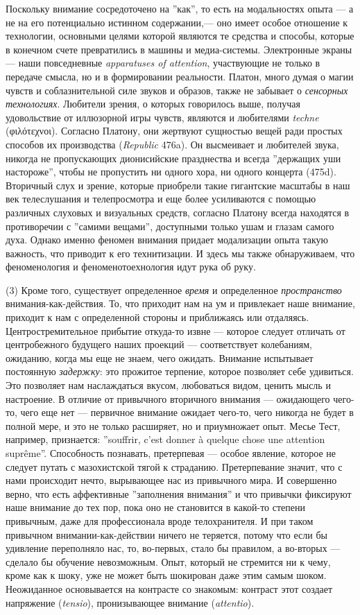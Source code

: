 \documentclass[12pt]{book}
\begin{document}
Поскольку внимание сосредоточено на ''как'', то есть на модальностях опыта --- а не на его потенциально истинном содержании,--- оно имеет особое отношение к технологии, основными целями которой являются те средства и способы, которые в конечном счете превратились в машины и медиа-системы. Электронные экраны --- наши повседневные \textit{apparatuses of attention}, участвующие не только в передаче смысла, но и в формировании реальности. Платон, много думая о магии чувств и соблазнительной силе звуков и образов, также не забывает о \textit{сенсорных технологиях}. Любители зрения, о которых говорилось выше, получая удовольствие от иллюзорной игры чувств, являются и любителями \textit{techne} (φιλότεχνοι). Согласно Платону, они жертвуют сущностью вещей ради простых способов их производства (\textit{Republic} 476a). Он высмеивает и любителей звука, никогда не пропускающих дионисийские празднества и всегда ''держащих уши настороже'', чтобы не пропустить ни одного хора, ни одного концерта (475d). Вторичный слух и зрение, которые приобрели такие гигантские масштабы в наш век телеслушания и телепросмотра и еще более усиливаются с помощью различных слуховых и визуальных средств, согласно Платону всегда находятся в противоречии с ''самими вещами'', доступными только ушам и глазам самого духа. Однако именно феномен внимания придает модализации опыта такую важность, что приводит к его технитизации. И здесь мы также обнаруживаем, что феноменология и феноменотоехнология идут рука об руку.

(3) Кроме того, существует определенное \textit{время} и определенное \textit{пространство} внимания-как-действия. То, что приходит нам на ум и привлекает наше внимание, приходит к нам с определенной стороны и приближаясь или отдаляясь. Центростремительное прибытие откуда-то извне --- которое следует отличать от центробежного будущего наших проекций --- соответствует колебаниям, ожиданию, когда мы еще не знаем, чего ожидать. Внимание испытывает постоянную \textit{задержку}: это прожитое терпение, которое позволяет себе удивиться. Это позволяет нам наслаждаться вкусом, любоваться видом, ценить мысль и настроение. В отличие от привычного вторичного внимания --- ожидающего чего-то, чего еще нет --- первичное внимание ожидает чего-то, чего никогда не будет в полной мере, и это не только расширяет, но и приумножает опыт. Месье Тест, например, признается: ''souffrir, c’est donner à quelque chose une attention suprême''. Способность познавать, претерпевая --- особое явление, которое не следует путать с мазохистской тягой к страданию. Претерпевание значит, что с нами происходит нечто, вырывающее нас из привычного мира. И совершенно верно, что есть аффективные ''заполнения внимания'' и что привычки фиксируют наше внимание до тех пор, пока оно не становится в какой-то степени привычным, даже для профессионала вроде телохранителя. И при таком привычном внимании-как-действии ничего не теряется, потому что если бы удивление переполняло нас, то, во-первых, стало бы правилом, а во-вторых --- сделало бы обучение невозможным. Опыт, который не стремится ни к чему, кроме как к шоку, уже не может быть шокирован даже этим самым шоком. Неожиданное основывается на контрасте со знакомым: контраст этот создает напряжение (\textit{tensio}), пронизывающее внимание (\textit{attentio}).
\end{document}
